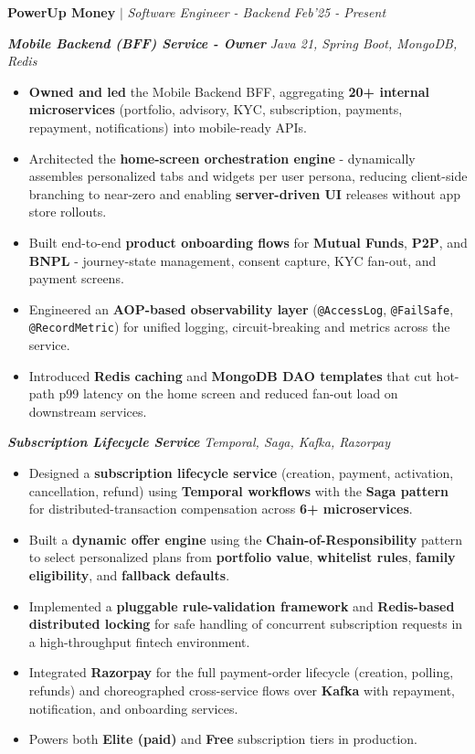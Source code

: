\documentclass[9pt]{extarticle}
\begin{document}
\hspace{-1.5mm}\textbf{PowerUp Money} $|$ \textit{Software Engineer - Backend} \hfill\hfill\textit{Feb'25 - Present}

\vspace{1mm}
\textbf{\textit{Mobile Backend (BFF) Service - Owner}} \hfill \textit{Java 21, Spring Boot, MongoDB, Redis}
\begin{itemize}
    \item \textbf{Owned and led} the Mobile Backend BFF, aggregating \textbf{20+ internal microservices} (portfolio, advisory, KYC, subscription, payments, repayment, notifications) into mobile-ready APIs.
    \item Architected the \textbf{home-screen orchestration engine} - dynamically assembles personalized tabs and widgets per user persona, reducing client-side branching to near-zero and enabling \textbf{server-driven UI} releases without app store rollouts.
    \item Built end-to-end \textbf{product onboarding flows} for \textbf{Mutual Funds}, \textbf{P2P}, and \textbf{BNPL} - journey-state management, consent capture, KYC fan-out, and payment screens.
    \item Engineered an \textbf{AOP-based observability layer} (\texttt{@AccessLog}, \texttt{@FailSafe}, \texttt{@RecordMetric}) for unified logging, circuit-breaking and metrics across the service.
    \item Introduced \textbf{Redis caching} and \textbf{MongoDB DAO templates} that cut hot-path p99 latency on the home screen and reduced fan-out load on downstream services.
\end{itemize}

\vspace{1.5mm}
\textbf{\textit{Subscription Lifecycle Service}} \hfill \textit{Temporal, Saga, Kafka, Razorpay}
\begin{itemize}
    \item Designed a \textbf{subscription lifecycle service} (creation, payment, activation, cancellation, refund) using \textbf{Temporal workflows} with the \textbf{Saga pattern} for distributed-transaction compensation across \textbf{6+ microservices}.
    \item Built a \textbf{dynamic offer engine} using the \textbf{Chain-of-Responsibility} pattern to select personalized plans from \textbf{portfolio value}, \textbf{whitelist rules}, \textbf{family eligibility}, and \textbf{fallback defaults}.
    \item Implemented a \textbf{pluggable rule-validation framework} and \textbf{Redis-based distributed locking} for safe handling of concurrent subscription requests in a high-throughput fintech environment.
    \item Integrated \textbf{Razorpay} for the full payment-order lifecycle (creation, polling, refunds) and choreographed cross-service flows over \textbf{Kafka} with repayment, notification, and onboarding services.
    \item Powers both \textbf{Elite (paid)} and \textbf{Free} subscription tiers in production.
\end{itemize}
\end{document}
